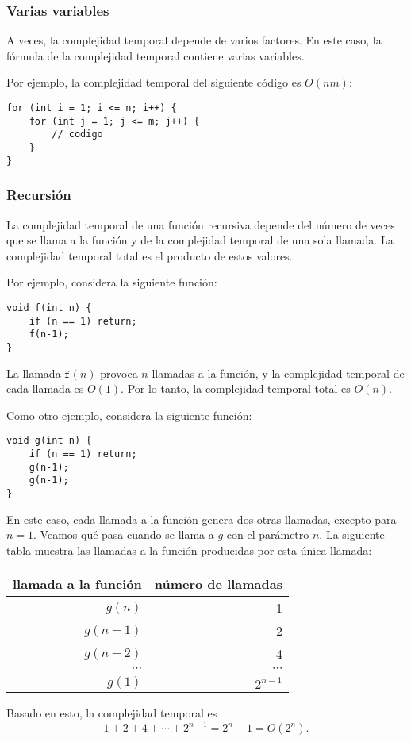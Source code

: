 \subsubsection*{Varias variables}

A veces, la complejidad temporal depende de
varios factores.
En este caso, la fórmula de la complejidad temporal
contiene varias variables.

Por ejemplo, la complejidad temporal del
siguiente código es $O(nm)$:

\begin{lstlisting}
for (int i = 1; i <= n; i++) {
    for (int j = 1; j <= m; j++) {
        // codigo
    }
}
\end{lstlisting}

\subsubsection*{Recursión}

La complejidad temporal de una función recursiva
depende del número de veces que se llama a la función
y de la complejidad temporal de una sola llamada.
La complejidad temporal total es el producto de
estos valores.

Por ejemplo, considera la siguiente función:
\begin{lstlisting}
void f(int n) {
    if (n == 1) return;
    f(n-1);
}
\end{lstlisting}
La llamada $\texttt{f}(n)$ provoca $n$ llamadas a la función,
y la complejidad temporal de cada llamada es $O(1)$.
Por lo tanto, la complejidad temporal total es $O(n)$.

Como otro ejemplo, considera la siguiente función:
\begin{lstlisting}
void g(int n) {
    if (n == 1) return;
    g(n-1);
    g(n-1);
}
\end{lstlisting}
En este caso, cada llamada a la función genera dos otras
llamadas, excepto para $n=1$.
Veamos qué pasa cuando se llama a $g$
con el parámetro $n$.
La siguiente tabla muestra las llamadas a la función
producidas por esta única llamada:
\begin{center}
\begin{tabular}{rr}
llamada a la función & número de llamadas \\
\hline
$g(n)$ & 1 \\
$g(n-1)$ & 2 \\
$g(n-2)$ & 4 \\
$\cdots$ & $\cdots$ \\
$g(1)$ & $2^{n-1}$ \\
\end{tabular}
\end{center}
Basado en esto, la complejidad temporal es
\[1+2+4+\cdots+2^{n-1} = 2^n-1 = O(2^n).\]

